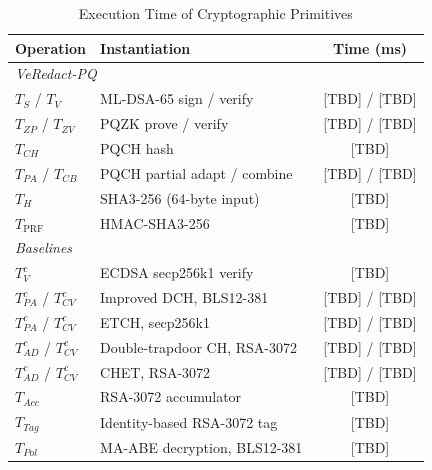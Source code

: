 \documentclass[lettersize,journal]{IEEEtran}
\begin{document}
\begin{table}[t]
\centering
\caption{Execution Time of Cryptographic Primitives}
\label{tab:primitives}
\scriptsize
\renewcommand{\arraystretch}{1.08}
\setlength{\tabcolsep}{4pt}
\begin{tabular}{llc}
\hline
\textbf{Operation} & \textbf{Instantiation} & \textbf{Time (ms)} \\
\hline
\multicolumn{3}{l}{\textit{VeRedact-PQ}} \\
$T_S$ / $T_V$
& ML-DSA-65 sign / verify
& [TBD] / [TBD] \\
$T_{ZP}$ / $T_{ZV}$
& PQZK prove / verify
& [TBD] / [TBD] \\
$T_{CH}$
& PQCH hash
& [TBD] \\
$T_{PA}$ / $T_{CB}$
& PQCH partial adapt / combine
& [TBD] / [TBD] \\
$T_H$
& SHA3-256 (64-byte input)
& [TBD] \\
$T_{\mathrm{PRF}}$
& HMAC-SHA3-256
& [TBD] \\
\hline
\multicolumn{3}{l}{\textit{Baselines}} \\
$T_V^{c}$
& ECDSA secp256k1 verify~\cite{ref1,ref27}
& [TBD] \\
$T_{PA}^{c}$ / $T_{CV}^{c}$
& Improved DCH, BLS12-381~\cite{ref1}
& [TBD] / [TBD] \\
$T_{PA}^{c}$ / $T_{CV}^{c}$
& ETCH, secp256k1~\cite{ref27}
& [TBD] / [TBD] \\
$T_{AD}^{c}$ / $T_{CV}^{c}$
& Double-trapdoor CH, RSA-3072~\cite{ref13}
& [TBD] / [TBD] \\
$T_{AD}^{c}$ / $T_{CV}^{c}$
& CHET, RSA-3072~\cite{ref34}
& [TBD] / [TBD] \\
$T_{Acc}$
& RSA-3072 accumulator~\cite{ref1,ref13}
& [TBD] \\
$T_{Tag}$
& Identity-based RSA-3072 tag~\cite{ref13}
& [TBD] \\
$T_{Pol}$
& MA-ABE decryption, BLS12-381~\cite{ref34}
& [TBD] \\
\hline
\end{tabular}
\end{table}
\end{document}
